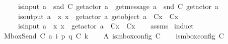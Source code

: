 \begin{isabellebody}
\ \ \ \ \ {\isachardoublequoteopen}is{\isacharunderscore}{\kern0pt}input\ a\ {\isasymLongrightarrow}\ {\isacharparenleft}{\kern0pt}snd\ {\isacharparenleft}{\kern0pt}C{}\ {\isacharparenleft}{\kern0pt}get{\isacharunderscore}{\kern0pt}actor\ a{\isacharparenright}{\kern0pt}{\isacharparenright}{\kern0pt}{\isacharparenright}{\kern0pt}\ {\isacharequal}{\kern0pt}\ {\isacharbrackleft}{\kern0pt}get{\isacharunderscore}{\kern0pt}message\ a{\isacharbrackright}{\kern0pt}\ {\isasymcdot}\ snd\ {\isacharparenleft}{\kern0pt}C{}\ {\isacharparenleft}{\kern0pt}get{\isacharunderscore}{\kern0pt}actor\ a{\isacharparenright}{\kern0pt}{\isacharparenright}{\kern0pt}{\isachardoublequoteclose}\isanewline
\ \ \ \ \ {\isachardoublequoteopen}is{\isacharunderscore}{\kern0pt}output\ a\ {\isasymLongrightarrow}\ {\isasymforall}x{\isachardot}{\kern0pt}\ x\ {\isasymnotin}\ {\isacharbraceleft}{\kern0pt}get{\isacharunderscore}{\kern0pt}actor\ a{\isacharcomma}{\kern0pt}\ get{\isacharunderscore}{\kern0pt}object\ a{\isacharbraceright}{\kern0pt}\ {\isasymlongrightarrow}\ C{}{\isacharparenleft}{\kern0pt}x{\isacharparenright}{\kern0pt}\ {\isacharequal}{\kern0pt}\ C{}{\isacharparenleft}{\kern0pt}x{\isacharparenright}{\kern0pt}{\isachardoublequoteclose}\isanewline
\ \ \ \ \ {\isachardoublequoteopen}is{\isacharunderscore}{\kern0pt}input\ a\ {\isasymLongrightarrow}\ {\isasymforall}x{\isachardot}{\kern0pt}\ x\ {\isasymnoteq}\ get{\isacharunderscore}{\kern0pt}actor\ a\ {\isasymlongrightarrow}\ C{}{\isacharparenleft}{\kern0pt}x{\isacharparenright}{\kern0pt}\ {\isacharequal}{\kern0pt}\ C{}{\isacharparenleft}{\kern0pt}x{\isacharparenright}{\kern0pt}{\isachardoublequoteclose}\isanewline
%
\isadelimproof
\ \ %
\endisadelimproof
%
\isatagproof
{}\isamarkupfalse%
\ assms\isanewline
{}\isamarkupfalse%
\ induct\isanewline
\ \ \isamarkupfalse%
\ {\isacharparenleft}{\kern0pt}MboxSend\ C{}\ a\ i\ p\ q\ C{}\ k{\isacharparenright}{\kern0pt}\isanewline
\ \ \isamarkupfalse%
\ A{}{\isacharcolon}{\kern0pt}\ {\isachardoublequoteopen}is{\isacharunderscore}{\kern0pt}mbox{\isacharunderscore}{\kern0pt}config\ C{}{\isachardoublequoteclose}\isanewline
\ \ \isamarkupfalse%
\ {\isachardoublequoteopen}is{\isacharunderscore}{\kern0pt}mbox{\isacharunderscore}{\kern0pt}config\ C{}{\isachardoublequoteclose}\ \isakeywordONE{{\isachardot}{\kern0pt}}\isamarkupfalse%

\end{isabellebody}
